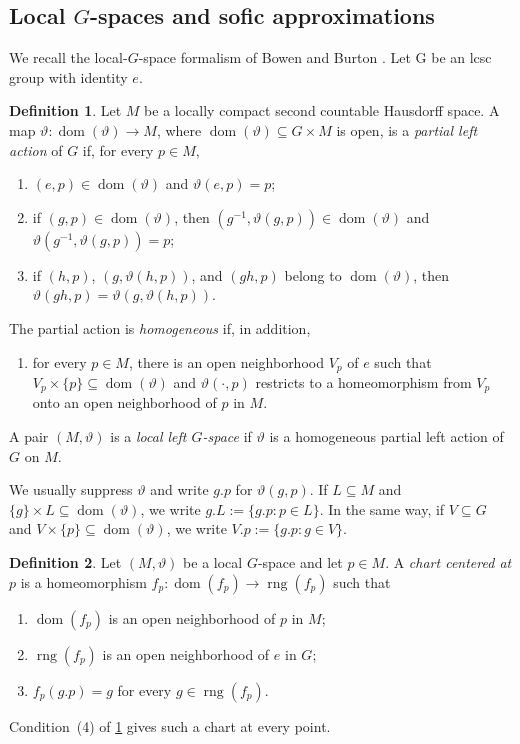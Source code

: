 \documentclass[12pt]{amsart}
\theoremstyle{definition}
\newtheorem{definition}[definition]{Definition}
\newcommand{\1}{\mathbf 1}
\begin{document}
\subsection{Local \texorpdfstring{$G$}{G}-spaces and sofic approximations}

We recall the local-$G$-space formalism of Bowen and Burton
\cite{BowenBurton}. Let G be an lcsc group with identity $e$.

\begin{definition}\label{defn}
Let $M$ be a locally compact second countable Hausdorff space. A map
$\vartheta:\operatorname{dom}(\vartheta)\to M$, where
$\operatorname{dom}(\vartheta)\subseteq G\times M$ is open, is a
\emph{partial left action} of $G$ if, for every $p\in M$,
\begin{enumerate}
\item $(e,p)\in\operatorname{dom}(\vartheta)$ and
$\vartheta(e,p)=p$;
\item if $(g,p)\in\operatorname{dom}(\vartheta)$, then
$(g^{-1},\vartheta(g,p))\in\operatorname{dom}(\vartheta)$ and
$\vartheta(g^{-1},\vartheta(g,p))=p$;
\item if $(h,p)$, $(g,\vartheta(h,p))$, and $(gh,p)$ belong to
$\operatorname{dom}(\vartheta)$, then
$\vartheta(gh,p)=\vartheta(g,\vartheta(h,p))$.
\end{enumerate}
The partial action is \emph{homogeneous} if, in addition,
\begin{enumerate}[resume]
\item for every $p\in M$, there is an open neighborhood $V_p$ of $e$ such
that $V_p\times\{p\}\subseteq\operatorname{dom}(\vartheta)$ and
$\vartheta(\cdot,p)$ restricts to a homeomorphism from $V_p$ onto an open
neighborhood of $p$ in $M$.
\end{enumerate}
A pair $(M,\vartheta)$ is a \emph{local left $G$-space} if $\vartheta$ is a
homogeneous partial left action of $G$ on $M$.
\end{definition}

We usually suppress $\vartheta$ and write $g.p$ for $\vartheta(g,p)$. If
$L\subseteq M$ and $\{g\}\times L\subseteq\operatorname{dom}(\vartheta)$, we
write $g.L:=\{g.p:p\in L\}$. In the same way, if $V\subseteq G$ and
$V\times\{p\}\subseteq\operatorname{dom}(\vartheta)$, we write
$V.p:=\{g.p:g\in V\}$.

\begin{definition}\label{def:chart}
Let $(M,\vartheta)$ be a local $G$-space and let $p\in M$. A
\emph{chart centered at $p$} is a homeomorphism
$f_p:\operatorname{dom}(f_p)\to\operatorname{rng}(f_p)$ such that
\begin{enumerate}
\item $\operatorname{dom}(f_p)$ is an open neighborhood of $p$ in $M$;
\item $\operatorname{rng}(f_p)$ is an open neighborhood of $e$ in $G$;
\item $f_p(g.p)=g$ for every $g\in\operatorname{rng}(f_p)$.
\end{enumerate}
Condition~(4) of \cref{defn} gives such a chart at every point.
\end{definition}
\end{document}
